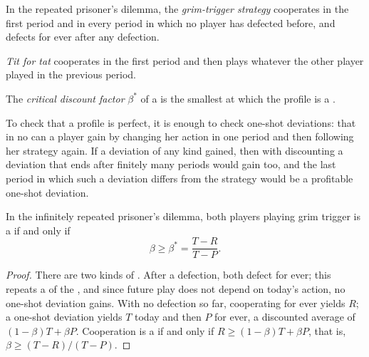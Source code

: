 \begin{definition}\label{def:b2:repeated-games:grim-trigger}
In the repeated prisoner's dilemma, the \emph{grim-trigger strategy} cooperates in
the first period and in every period in which no player has defected before, and defects for ever after any
defection.
\end{definition}

\begin{definition}\label{def:b2:repeated-games:tit-for-tat}
\emph{Tit for tat} cooperates in the first period and then plays whatever the other player
played in the previous period.
\end{definition}

\begin{definition}\label{def:b2:repeated-games:critical-delta}
The \emph{critical discount factor} $\beta^*$ of a  is the smallest
 at which the profile is a .
\end{definition}

To check that a profile is  perfect, it is enough to check one-shot deviations: that in no  can a
player gain by changing her action in one period and then following her strategy again. If a deviation of any
kind gained, then with discounting a deviation that ends after finitely many periods would gain too, and the
last period in which such a deviation differs from the strategy would be a profitable one-shot deviation.

\begin{proposition}\label{prop:b2:repeated-games:grim}
In the infinitely repeated prisoner's dilemma, both players playing grim trigger is a  if and only if
\[
\beta \ge \beta^* = \frac{T - R}{T - P}.
\]
\end{proposition}

\begin{proof}
There are two kinds of . After a defection, both defect for ever; this repeats a  of the
, and since future play does not depend on today's action, no one-shot deviation gains. With no
defection so far, cooperating for ever yields $R$; a one-shot deviation yields $T$ today and then $P$ for ever, a
discounted average of $(1 - \beta)T + \beta P$. Cooperation is a  if and only if $R \ge (1 - \beta)T + \beta P$, that is,
$\beta \ge (T - R)/(T - P)$.
\end{proof}

